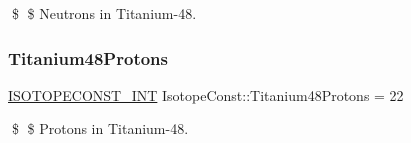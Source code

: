 \$ \$ Neutrons in Titanium-\/48. \mbox{\label{group___isotope_const-_titanium-_ti48_ga4fd398ef067efed553d87a85c8ebadc6}} 
\subsubsection{\texorpdfstring{Titanium48\+Protons}{Titanium48Protons}}
{\footnotesize\ttfamily \mbox{\hyperlink{group___isotope_const-_macros_ga5f18360b3e99483a35c32d789e62621c}{I\+S\+O\+T\+O\+P\+E\+C\+O\+N\+S\+T\+\_\+\+I\+NT}} Isotope\+Const\+::\+Titanium48\+Protons = 22}

\$ \$ Protons in Titanium-\/48. 